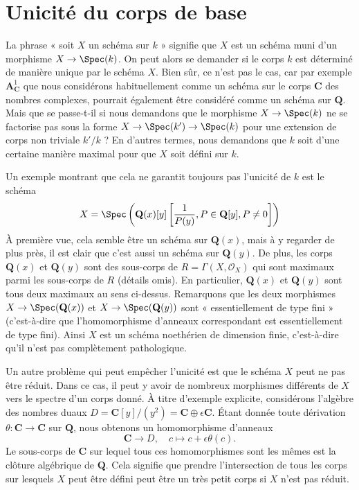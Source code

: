 \section{Unicité du corps de base} 
\label{section-base-field}

\noindent
 La phrase « soit $X$ un schéma sur $k$ » signifie que $X$ est un
schéma muni d'un morphisme $X \to \Spec(k)$. On peut alors
se demander si le corps $k$ est déterminé de manière unique par le schéma $X$.
Bien sûr, ce n'est pas le cas, car par exemple 
$\mathbf{A}^1_{\mathbf{C}}$ que nous considérons habituellement comme un schéma
sur le corps $\mathbf{C}$ des nombres complexes, pourrait également être considéré comme
un schéma sur $\mathbf{Q}$. Mais que se passe-t-il si nous demandons que le morphisme 
$X \to \Spec(k)$ ne se factorise pas sous la forme 
$X \to \Spec(k') \to \Spec(k)$ pour une extension de corps
non triviale $k'/k$ ? En d'autres termes, nous demandons que $k$ soit
d'une certaine manière maximal pour que $X$ soit défini sur $k$.

\medskip\noindent
 Un exemple montrant que cela ne garantit toujours pas l'unicité de $k$
 est le schéma 
$$
X =
\Spec\left(
\mathbf{Q}(x)[y]\left[\frac{1}{P(y)}, P \in \mathbf{Q}[y], P \not = 0\right]
\right)
$$
 À première vue, cela semble être un schéma sur $\mathbf{Q}(x)$, mais
à y regarder de plus près, il est clair que c'est aussi un schéma sur $\mathbf{Q}(y)$.
De plus, les corps $\mathbf{Q}(x)$ et $\mathbf{Q}(y)$ sont des sous-corps
de $R = \Gamma(X, \mathcal{O}_X)$ qui sont maximaux parmi les sous-corps de 
$R$ (détails omis). En particulier, $\mathbf{Q}(x)$ et 
$\mathbf{Q}(y)$ sont tous deux maximaux au sens ci-dessus. Remarquons que les deux morphismes 
$X \to \Spec(\mathbf{Q}(x))$
 et $X \to \Spec(\mathbf{Q}(y))$ sont « essentiellement de type fini
» (c'est-à-dire que l'homomorphisme d'anneaux correspondant est essentiellement de type fini).
Ainsi $X$ est un schéma noethérien de dimension finie, c'est-à-dire
qu'il n'est pas complètement pathologique.

\medskip\noindent
 Un autre problème qui peut empêcher l'unicité est que le schéma $X$ peut
ne pas être réduit. Dans ce cas, il peut y avoir de nombreux morphismes différents
de $X$ vers le spectre d'un corps donné. À titre d'exemple explicite, considérons
l'algèbre des nombres duaux 
$D = \mathbf{C}[y]/(y^2) = \mathbf{C} \oplus \epsilon \mathbf{C}$.
Étant donnée toute dérivation $\theta : \mathbf{C} \to \mathbf{C}$ sur $\mathbf{Q}$,
nous obtenons un homomorphisme d'anneaux 
$$
\mathbf{C} \longrightarrow D, \quad
c \longmapsto c + \epsilon \theta(c).
$$
 Le sous-corps de $\mathbf{C}$ sur lequel tous ces homomorphismes sont les
mêmes est la clôture algébrique de $\mathbf{Q}$. Cela signifie que prendre
l'intersection de tous les corps sur lesquels $X$ peut être défini peut
être un très petit corps si $X$ n'est pas réduit.

